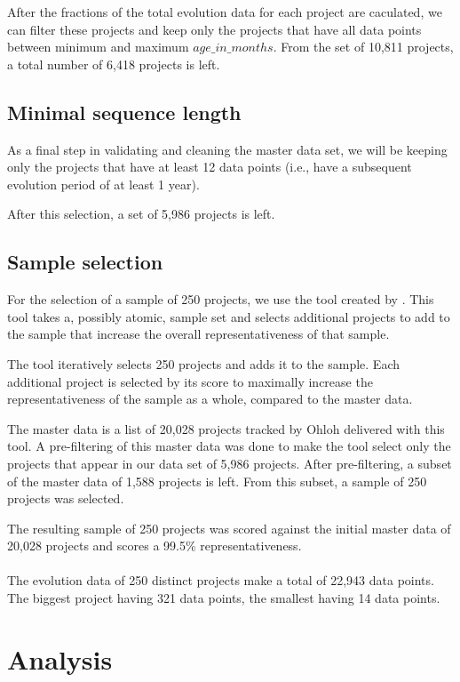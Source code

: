 After the fractions of the total evolution data for each project are caculated,
we can filter these projects and keep only the projects that have all data points
between minimum and maximum $age\_in\_months$. From the set of 10,811 projects,
a total number of 6,418 projects is left.

\subsection{Minimal sequence length}
As a final step in validating and cleaning the master data set, we will be
keeping only the projects that have at least 12 data points (i.e., have a
subsequent evolution period of at least 1 year).

After this selection, a set of 5,986 projects is left.

\subsection{Sample selection}
For the selection of a sample of 250 projects, we use the tool created by
\citet{nagappan}. This tool takes a, possibly atomic, sample set and selects
additional projects to add to the sample that increase the overall
representativeness of that sample.

The tool iteratively selects 250 projects and adds it to the sample. Each
additional project is selected by its score to maximally increase the
representativeness of the sample as a whole, compared to the master data.

The master data is a list of 20,028 projects tracked by Ohloh delivered with
this tool. A pre-filtering of this master data was done to make the tool select
only the projects that appear in our data set of 5,986 projects. After
pre-filtering, a subset of the master data of 1,588 projects is left. From this
subset, a sample of 250 projects was selected.

The resulting sample of 250 projects was scored against the initial master data
of 20,028 projects and scores a 99.5\% representativeness.

\paragraph{}
The evolution data of 250 distinct projects make a total of 22,943 data points.
The biggest project having 321 data points, the smallest having 14 data points.

\section{Analysis}

